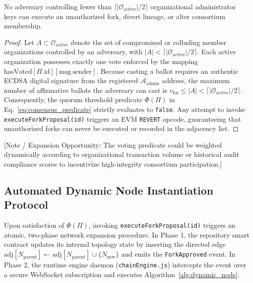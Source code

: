 \begin{theorem}
\label{thm:gov_safety}
No adversary controlling fewer than $\lceil |\mathcal{O}_{\text{active}}| / 2 \rceil$ organizational administrator keys can execute an unauthorized fork, divert lineage, or alter consortium membership.
\end{theorem}

\begin{proof}
Let $A \subset \mathcal{O}_{\text{active}}$ denote the set of compromised or colluding member organizations controlled by an adversary, with $|A| < \lceil |\mathcal{O}_{\text{active}}| / 2 \rceil$. Each active organization possesses exactly one vote enforced by the mapping $\text{hasVoted}[\Pi.\text{id}][\text{msg.sender}]$. Because casting a ballot requires an authentic ECDSA digital signature from the registered $\mathcal{A}_{\text{admin}}$ address, the maximum number of affirmative ballots the adversary can cast is $v_{\text{for}} \le |A| < \lceil |\mathcal{O}_{\text{active}}| / 2 \rceil$. Consequently, the quorum threshold predicate $\Phi(\Pi)$ in Eq.~\eqref{eq:consensus_predicate} strictly evaluates to \texttt{false}. Any attempt to invoke \texttt{executeForkProposal(id)} triggers an EVM \texttt{REVERT} opcode, guaranteeing that unauthorized forks can never be executed or recorded in the adjacency list.
\end{proof}

[Note / Expansion Opportunity: The voting predicate could be weighted dynamically according to organizational transaction volume or historical audit compliance scores to incentivize high-integrity consortium participation.]

\subsection{Automated Dynamic Node Instantiation Protocol}
Upon satisfaction of $\Phi(\Pi)$, invoking \texttt{executeForkProposal(id)} triggers an atomic, two-phase network expansion procedure. In Phase 1, the repository smart contract updates its internal topology state by inserting the directed edge $\text{adj}[N_{\text{parent}}] \leftarrow \text{adj}[N_{\text{parent}}] \cup \{N_{\text{new}}\}$ and emits the \texttt{ForkApproved} event. In Phase 2, the runtime engine daemon (\texttt{chainEngine.js}) intercepts the event over a secure WebSocket subscription and executes Algorithm~\ref{alg:dynamic_node}.

